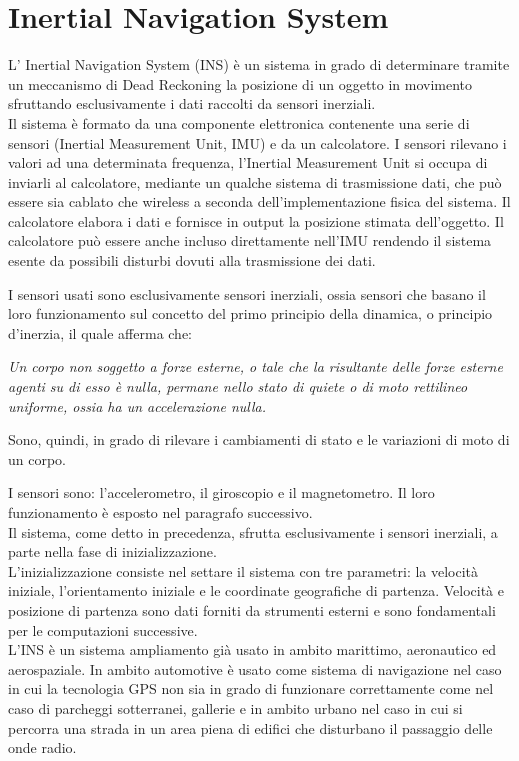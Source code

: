 \documentclass[12pt,a4paper,openright,twoside]{report}
\begin{document}
\section {Inertial Navigation System}
L' Inertial Navigation System (INS) è un sistema in grado di determinare tramite un meccanismo di Dead Reckoning la posizione di un oggetto in movimento sfruttando esclusivamente i dati raccolti da sensori inerziali.\\

Il sistema è formato da una componente elettronica contenente una serie di sensori (Inertial Measurement Unit, IMU) e da un calcolatore. I sensori rilevano i valori ad una determinata frequenza, l'Inertial Measurement Unit si occupa di inviarli al calcolatore, mediante un qualche sistema di trasmissione dati, che può essere sia cablato che wireless a seconda dell'implementazione fisica del sistema. Il calcolatore elabora i dati e fornisce in output la posizione stimata dell'oggetto. Il calcolatore può essere anche incluso direttamente nell'IMU rendendo il sistema esente da possibili disturbi dovuti alla trasmissione dei dati.

I sensori usati sono esclusivamente sensori inerziali, ossia sensori che basano il loro funzionamento sul concetto del primo principio della dinamica, o principio d'inerzia, il quale afferma che:
\begin{center}
\emph{Un corpo non soggetto a forze esterne, o tale che la risultante delle forze esterne agenti su di esso è nulla, permane nello stato di quiete o di moto rettilineo uniforme, ossia ha un accelerazione nulla.}
\end{center}
Sono, quindi, in grado di rilevare i cambiamenti di stato e le variazioni di moto di un corpo.

I sensori sono: l'accelerometro, il giroscopio e il magnetometro. Il loro funzionamento è esposto nel paragrafo successivo. \\

Il sistema, come detto in precedenza, sfrutta esclusivamente i sensori inerziali, a parte nella fase di inizializzazione.\\
L'inizializzazione consiste nel settare il sistema con tre parametri: la velocità iniziale, l'orientamento iniziale e le coordinate geografiche di partenza. Velocità e posizione di partenza sono dati forniti da strumenti esterni e sono fondamentali per le computazioni successive.\\

L'INS è un sistema ampliamento già usato in ambito marittimo, aeronautico ed aerospaziale. 
In ambito automotive è usato come sistema di navigazione nel caso in cui la tecnologia GPS non sia in grado di funzionare correttamente come nel caso di parcheggi sotterranei, gallerie e in ambito urbano nel caso in cui si percorra una strada in un area piena di edifici che disturbano il passaggio delle onde radio.
\end{document}
